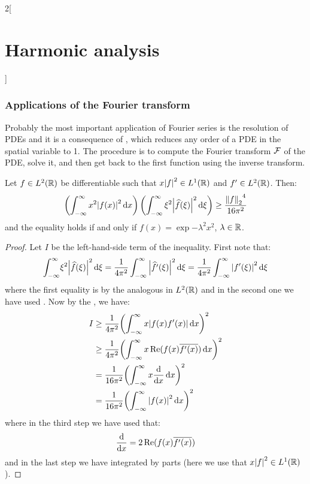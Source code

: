 \documentclass[../../../main_math.tex]{subfiles}
\begin{document}
\begin{multicols}{2}[\section{Harmonic analysis}]
  \subsubsection{Applications of the Fourier transform}
  \begin{remark}
    Probably the most important application of Fourier series is the resolution of PDEs and it is a consequence of , which reduces any order of a PDE in the spatial variable to 1. The procedure is to compute the Fourier transform $\mathcal{F}$ of the PDE, solve it, and then get back to the first function using the inverse transform.
  \end{remark}
  \begin{theorem}
    Let $f\in L^2(\mathbb{R})$ be differentiable such that $x\abs{f}^2\in L^1(\mathbb{R})$ and $f'\in L^2(\mathbb{R})$. Then:
    $$\left(\int_{-\infty}^\infty x^2 \abs{f(x)}^2\dd{x}\right)\left(\int_{-\infty}^\infty \xi^2 \abs{\widehat{f}(\xi)}^2\dd{\xi}\right)\geq \frac{{\left\|f\right\|_2}^4}{16\pi^2}$$
    and the equality holds if and only if $f(x)=\exp{-\lambda^2x^2}$, $\lambda\in\mathbb{R}$.
  \end{theorem}
  \begin{proof}
    Let $I$ be the left-hand-side term of the inequality. First note that:
    $$\int_{-\infty}^\infty \!\xi^2 \abs{\widehat{f}(\xi)}^2\dd{\xi}=\frac{1}{4\pi^2}\int_{-\infty}^\infty \abs{\widehat{f'}(\xi)}^2\dd{\xi}=\frac{1}{4\pi^2}\int_{-\infty}^\infty \abs{{f'}(\xi)}^2\dd{\xi}$$
    where the first equality is by the analogous  in $L^2(\mathbb{R})$ and in the second one we have used .
    Now by the , we have:
    \begin{align*}
      I & \geq \frac{1}{4\pi^2}{\left(\int_{-\infty}^\infty x\abs{f(x){f'}(x)}\dd{x}\right)}^2         \\
        & \geq \frac{1}{4\pi^2}{\left(\int_{-\infty}^\infty x\Re(f(x)\overline{f'(x)})\dd{x}\right)}^2 \\
        & = \frac{1}{16\pi^2}{\left(\int_{-\infty}^\infty x\dv{}{x}(\abs{f(x)}^2)\dd{x}\right)}^2      \\
        & = \frac{1}{16\pi^2}{\left(\int_{-\infty}^\infty \abs{f(x)}^2\dd{x}\right)}^2                 \\
    \end{align*}
    where in the third step we have used that:
    $$\dv{}{x}(\abs{f(x)}^2)=2\Re(f(x)\overline{f'(x)})$$
    and in the last step we have integrated by parts (here we use that $x\abs{f}^2\in L^1(\mathbb{R})$).

\end{proof}
\end{multicols}
\end{document}
